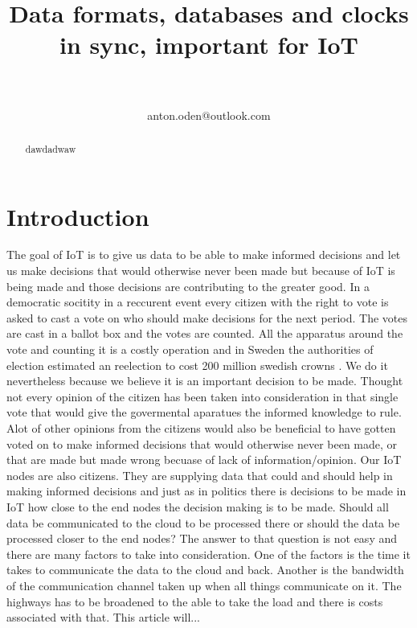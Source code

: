 \documentclass[article,a4paper]{IEEEtran}
\title{Data formats, databases and clocks in sync, important for IoT}
\author{
\IEEEauthorblockN{Anton Odén}\\
\IEEEauthorblockA{Dept. of Maths and Computer Science\\Karlstad University\\
651 88 KARLSTAD, Sweden}\\
anton.oden@outlook.com
}
\begin{document}
\maketitle

\begin{abstract}
        dawdadwaw
\end{abstract}

\section{Introduction}
The goal of IoT is to give us data to be able to make informed decisions and let us make decisions that would otherwise never been made but because of IoT is being made and those decisions are contributing to the greater good. In a democratic socitity in a reccurent event every citizen with the right to vote is asked to cast a vote on who should make decisions for the next period. The votes are cast in a ballot box and the votes are counted. All the apparatus around the vote and counting it is a costly operation and in Sweden the authorities of election estimated an reelection to cost 200 million swedish crowns \cite{costElection}. We do it nevertheless because we believe it is an important decision to be made. Thought not every opinion of the citizen has been taken into consideration in that single vote that would give the govermental aparatues the informed knowledge to rule. Alot of other opinions from the citizens would also be beneficial to have gotten voted on to make informed decisions that would otherwise never been made, or that are made but made wrong becuase of lack of information/opinion. Our IoT nodes are also citizens. They are supplying data that could and should help in making informed decisions and just as in politics there is decisions to be made in IoT how close to the end nodes the decision making is to be made. Should all data be communicated to the cloud to be processed there or should the data be processed closer to the end nodes? The answer to that question is not easy and there are many factors to take into consideration. One of the factors is the time it takes to communicate the data to the cloud and back. Another is the bandwidth of the communication channel taken up when all things communicate on it. The highways has to be broadened to the able to take the load and there is costs associated with that. This article will...
\end{document}
